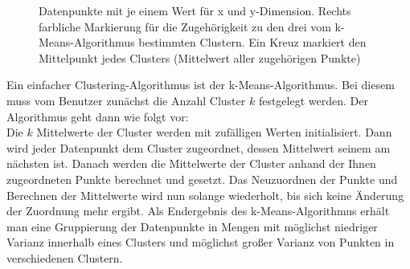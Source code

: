 \documentclass[
	twoside,
	12pt,
	a4paper,
	BCOR10mm,
	DIV14,
	listof=totoc,
	bibliography=totoc,
	headsepline
]{scrreprt}
\begin{document}
\begin{figure} [h]
	\hfill
	\caption{Datenpunkte mit je einem Wert für x und y-Dimension. Rechts farbliche Markierung für die Zugehörigkeit zu den drei vom k-Means-Algorithmus bestimmten Clustern. Ein Kreuz markiert den Mittelpunkt jedes Clusters (Mittelwert aller zugehörigen Punkte)}
	\label{fig:clustering_beispiel}
\end{figure} 

Ein einfacher Clustering-Algorithmus ist der k-Means-Algorithmus. Bei diesem muss vom Benutzer zunächst die Anzahl Cluster $k$ festgelegt werden. 
Der Algorithmus geht dann wie folgt vor:\\
Die $k$ Mittelwerte der Cluster werden mit zufälligen Werten initialisiert. Dann wird jeder Datenpunkt dem Cluster zugeordnet, dessen Mittelwert seinem am nächsten ist. Danach werden die Mittelwerte der Cluster anhand der Ihnen zugeordneten Punkte berechnet und gesetzt. Das Neuzuordnen der Punkte und Berechnen der Mittelwerte wird nun solange wiederholt, bis sich keine Änderung der Zuordnung mehr ergibt. Als Endergebnis des k-Means-Algorithmus erhält man eine Gruppierung der Datenpunkte in Mengen mit möglichst niedriger Varianz innerhalb eines Clusters und möglichst großer Varianz von Punkten in verschiedenen Clustern.
\end{document}
